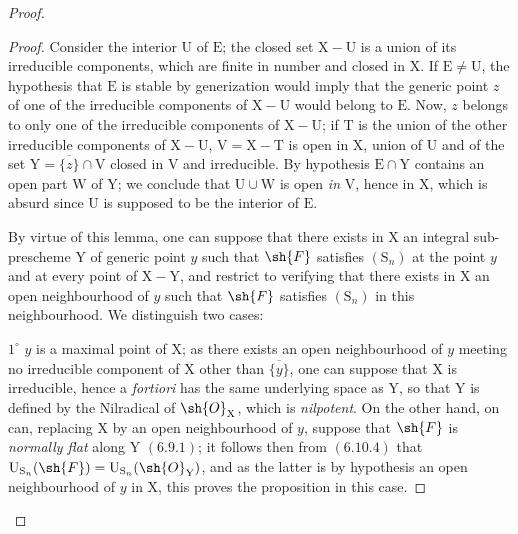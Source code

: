 \begin{proof}
\begin{proof}
Consider the interior $\mathrm{U}$ of $\mathrm{E}$; the closed set $\mathrm{X}-\mathrm{U}$ is a union of its
irreducible components, which are finite in number and closed in $\mathrm{X}$. If $\mathrm{E}\neq\mathrm{U}$,
the hypothesis that $\mathrm{E}$ is stable by generization would imply that the generic point $z$ of one
of the irreducible components of $\mathrm{X}-\mathrm{U}$ would belong to $\mathrm{E}$. Now, $z$ belongs to only
one of the irreducible components of $\mathrm{X}-\mathrm{U}$; if $\mathrm{T}$ is the union of the other
irreducible components of $\mathrm{X}-\mathrm{U}$, $\mathrm{V}=\mathrm{X}-\mathrm{T}$ is open in $\mathrm{X}$, union of $\mathrm{U}$ and of
the set $\mathrm{Y}=\overline{\{z\}}\cap\mathrm{V}$ closed in $\mathrm{V}$ and irreducible. By hypothesis $\mathrm{E}\cap\mathrm{Y}$ contains
an open part $\mathrm{W}$ of $\mathrm{Y}$; we conclude that $\mathrm{U}\cup\mathrm{W}$ is open \emph{in} $\mathrm{V}$, hence in $\mathrm{X}$,
which is absurd since $\mathrm{U}$ is supposed to be the interior of $\mathrm{E}$.


By virtue of this lemma, one can suppose that there exists in $\mathrm{X}$ an integral sub-prescheme
$\mathrm{Y}$ of generic point $y$ such that $\sh{F}$ satisfies $(\mathrm{S}_n)$ at the point $y$ and at every point of
$\mathrm{X}-\mathrm{Y}$, and restrict to verifying that there exists in $\mathrm{X}$ an open neighbourhood of $y$ such
that $\sh{F}$ satisfies $(\mathrm{S}_n)$ in this neighbourhood. We distinguish two cases:

$1^\circ$ $y$ is a maximal point of $\mathrm{X}$; as there exists an open neighbourhood of $y$ meeting
no irreducible component of $\mathrm{X}$ other than $\overline{\{y\}}$, one can suppose
that $\mathrm{X}$ is irreducible, hence a \emph{fortiori} has the same underlying space as $\mathrm{Y}$, so that $\mathrm{Y}$ is defined
by the Nilradical of $\sh{O}_\mathrm{X}$, which is \emph{nilpotent}. On the other hand, on can, replacing $\mathrm{X}$ by
an open neighbourhood of $y$, suppose that $\sh{F}$ is \emph{normally flat} along $\mathrm{Y}$ $(6.9.1)$;
it follows then from $(6.10.4)$ that $\mathrm{U}_{\mathrm{S}_n}(\sh{F})=\mathrm{U}_{\mathrm{S}_n}(\sh{O}_\mathrm{Y})$, and as the latter is by hypothesis an open
neighbourhood of $y$ in $\mathrm{X}$, this proves the proposition in this case.


\end{proof}
\end{proof}
